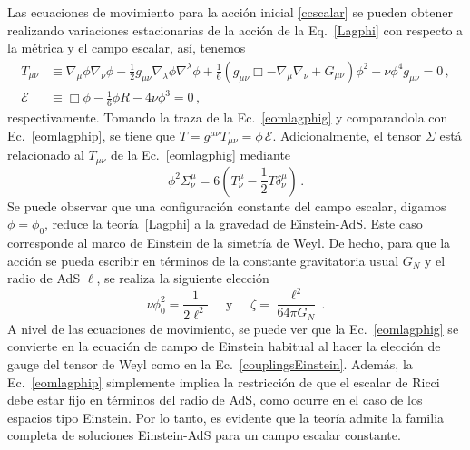 \documentclass[../Main.tex]{subfiles}
\begin{document}
Las ecuaciones de movimiento para la acción inicial \eqref{ccscalar} se pueden obtener realizando variaciones estacionarias de la acción de la Eq.~\eqref{Lagphi} con respecto a la métrica y el campo escalar, así, tenemos
\begin{subequations}\label{EOMLagphi}
\begin{align}\label{eomlagphig}
    T_{\mu\nu} &\equiv \nabla_\mu\phi\nabla_\nu\phi - \frac{1}{2}g_{\mu\nu}\nabla_\lambda\phi\nabla^\lambda\phi + \frac{1}{6}\left(g_{\mu\nu}\Box - \nabla_\mu\nabla_\nu + G_{\mu\nu} \right)\phi^2 - \nu\phi^4 g_{\mu\nu} = 0 \,, \\\label{eomlagphip}
   \mathcal{E} &\equiv\Box\phi - \frac{1}{6}\phi R - 4\nu\phi^3 = 0\,, 
\end{align}
\end{subequations}
respectivamente. Tomando la traza de la Ec.~\eqref{eomlagphig} y comparandola con Ec.~\eqref{eomlagphip}, se tiene que $T= g^{\mu\nu}T_{\mu\nu}=\phi\,\mathcal{E}$. Adicionalmente, el tensor $\Sigma$ está relacionado al $T_{\mu\nu}$ de la Ec.~\eqref{eomlagphig} mediante
\begin{equation}\label{SigmaT}
\phi^{2}\Sigma^\mu_\nu=6\left(T^\mu_\nu - \frac{1}{2}T\delta^\mu_\nu\right)\,.
\end{equation}
Se puede observar que una configuración constante del campo escalar, digamos $\phi=\phi_0$, reduce la teoría~\eqref{Lagphi} a la gravedad de Einstein-AdS. Este caso corresponde al marco de Einstein de la simetría de Weyl. De hecho, para que la acción se pueda escribir en términos de la constante gravitatoria usual $G_N$ y el radio de AdS $\ell$, se realiza la siguiente elección
\begin{equation}\label{couplingsEinstein}
    \nu \phi_{0}^{2} = \frac{1}{2\ell^2} \;\;\;\;\; \mbox{y} \;\;\;\;\;  \zeta = \frac{\ell^2}{64\pi G_{N}}\,.
\end{equation}
A nivel de las ecuaciones de movimiento, se puede ver que la Ec.~\eqref{eomlagphig} se convierte en la ecuación de campo de Einstein habitual al hacer la elección de gauge del tensor de Weyl como en la Ec.~\eqref{couplingsEinstein}. Además, la Ec.~\eqref{eomlagphip} simplemente implica la restricción de que el escalar de Ricci debe estar fijo en términos del radio de AdS, como ocurre en el caso de los espacios tipo Einstein. Por lo tanto, es evidente que la teoría admite la familia completa de soluciones Einstein-AdS para un campo escalar constante.
\end{document}
